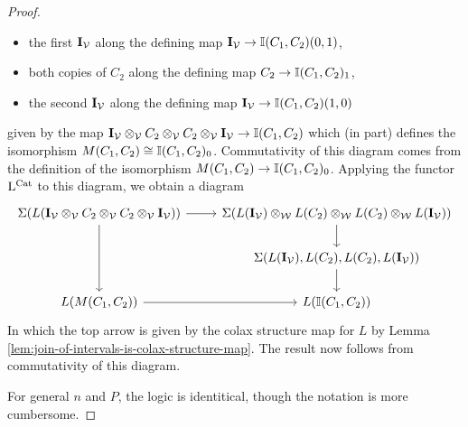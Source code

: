 \documentclass[12pt]{amsart}
\begin{document}
\begin{proof}
\begin{itemize}
	 		\item the first $\mathbf{I}_\mathcal{V}$ along the defining map $\mathbf{I}_\mathcal{V} \to \mathbb{I}(C_1,C_2)(0,1)$,
	 		\item both copies of $C_2$ along the defining map $C_2 \to \mathbb{I}(C_1,C_2)_1$,
	 		\item the second $\mathbf{I}_\mathcal{V}$ along the defining map $\mathbf{I}_\mathcal{V} \to \mathbb{I}(C_1,C_2)(1,0)$
		\end{itemize}	 		 
	 given by the map $\mathbf{I}_\mathcal{V} \otimes_\mathcal{V} C_2 \otimes_\mathcal{V} C_2 \otimes_\mathcal{V} \mathbf{I}_\mathcal{V} \to \mathbb{I}(C_1,C_2)$ which (in part) defines the isomorphism $M(C_1,C_2) \cong \mathbb{I}(C_1,C_2)_0$. 
	 Commutativity of this diagram comes from the definition of the isomorphism $M(C_1,C_2) \to \mathbb{I}(C_1,C_2)_0$.
	 Applying the functor $\mathrm{L}^{\mathrm{Cat}}$ to this diagram, we obtain a diagram 
	 \begin{equation}
	 \begin{tikzcd}
	 	\sus(L(\iv \ov C_2 \ov C_2 \ov \iv)) 
	 		\ar[r] 
	 		\ar[dd]
	 	&
	 	\sus(L(\iv) \ow L(C_2) \ow L(C_2) \ow L(\iv)) 
	 		\ar[d]
		\\
		&
	 	\sus(L(\iv), L(C_2), L(C_2), L(\iv))
	 		\ar[d]
	 	\\
	 	L(M(C_1,C_2)) \ar[r]
	 	&
	 	L(\I(C_1,C_2))
	 \end{tikzcd}
	 \end{equation}
	 In which the top arrow is given by the colax structure map for $L$ by Lemma \ref{lem:join-of-intervals-is-colax-structure-map}. 
	 The result now follows from commutativity of this diagram. 
	 \par 
	 For general $n$ and $P$, the logic is identitical, though the notation is more cumbersome.
\end{proof}
\end{document}
